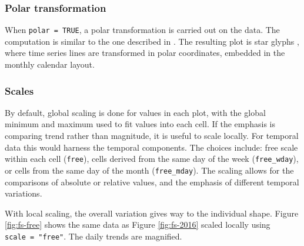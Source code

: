 \documentclass[12pt]{article}
\begin{document}
\hypertarget{polar-transformation}{%
\subsubsection{Polar transformation}\label{polar-transformation}}

When \texttt{polar\ =\ TRUE}, a polar transformation is carried out on the data. The computation is similar to the one described in \citet{Wickham2012glyph}. The resulting plot is star glyphs \citep{chambers2017graphical}, where time series lines are transformed in polar coordinates, embedded in the monthly calendar layout.



\hypertarget{scales}{%
\subsubsection{Scales}\label{scales}}

By default, global scaling is done for values in each plot, with the global minimum and maximum used to fit values into each cell. If the emphasis is comparing trend rather than magnitude, it is useful to scale locally. For temporal data this would harness the temporal components. The choices include: free scale within each cell (\texttt{free}), cells derived from the same day of the week (\texttt{free\_wday}), or cells from the same day of the month (\texttt{free\_mday}). The scaling allows for the comparisons of absolute or relative values, and the emphasis of different temporal variations.

With local scaling, the overall variation gives way to the individual shape. Figure \ref{fig:fs-free} shows the same data as Figure \ref{fig:fs-2016} scaled locally using \texttt{scale\ =\ "free"}. The daily trends are magnified.
\end{document}
